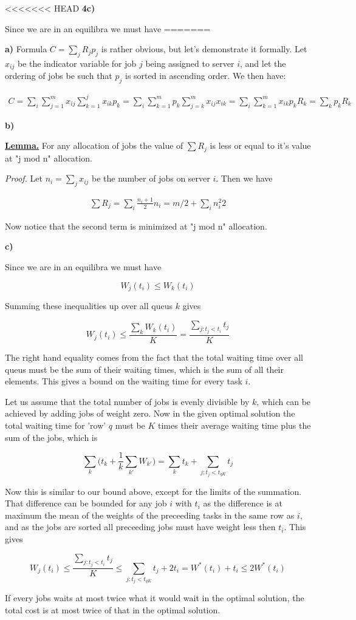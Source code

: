<<<<<<< HEAD
\textbf{4c)}

Since we are in an equilibra we must have
=======

\textbf{a)} Formula $C=\sum_j R_j p_j$ is rather obvious, but let's demonstrate it formally. Let $x_{ij}$ be the indicator variable for job $j$ being assigned to server $i$, and let the ordering of jobs be such that $p_j$ is sorted in ascending order. We then have:

\begin{align*}
C = \sum_i \sum_{j=1}^m x_{ij}\sum_{k=1}^j x_{ik}p_k = \sum_i \sum_{k=1}^m p_k \sum_{j=k}^m x_{ij}x_{ik} = \sum_i \sum_{k=1}^m x_{ik} p_k R_k = \sum_k p_k R_k
\end{align*}

\textbf{b)}

\uline{\textbf{Lemma.}} For any allocation of jobs the value of $\sum R_j$ is less or equal to it's value at "j mod n" allocation. 

\textit{Proof.} Let $n_i=\sum_j x_{ij}$ be the number of jobs on server $i$. Then we have

\begin{align*}
\sum R_j = \sum_i \frac{n_i+1}{2} n_i = m/2 + \sum_i {n_i^2}{2}
\end{align*}

Now notice that the second term is minimized at "j mod n" allocation. 

\textbf{c)}

Since we are in an equilibra we must have

$$
W_j(t_i) \le W_k(t_i)
$$

Summing these inequalities up over all queus $k$ gives

$$
W_j(t_i) \le \frac{\sum_k W_k(t_i)}{K}  = \frac{\sum_{j: t_j < t_i}  t_j}{K} 
$$

The right hand equality comes from the fact that the total waiting time over all queus must be the sum of their waiting times, which is the sum of all their elements. This gives a bound on the waiting time for every task $i$. 

Let us assume that the total number of jobs is evenly divisible by $k$, which can be achieved by adding jobs of weight zero. Now in the given optimal solution the total waiting time for 'row' $q$ must be $K$ times their average waiting time plus the sum of the jobs, which is

$$
\sum_k \bigg( t_k + \frac{1}{k} \sum_{k'} W_{k'} \bigg) = \sum_k t_k +  \sum_{j: t_j < t_{qK}}  t_j 
$$

Now this is similar to our bound above, except for the limits of the summation. That difference can be bounded for any job $i$ with $t_i$ as the difference is at maximum the mean of the weights of the preceeding tasks in the same row as $i$, and as the jobs are sorted all preceeding jobs must have weight less then $t_i$. This gives 

$$
W_j(t_i) \le \frac{\sum_{j: t_j < t_i}  t_j}{K}  \le \sum_{j: t_j < t_{qK}}  t_j  +  2 t_i =  W^*(t_i) + t_i \le 2 W^*(t_i)
$$

If every jobs waits at most twice what it would wait in the optimal solution, the total cost is at most twice of that in the optimal solution.
